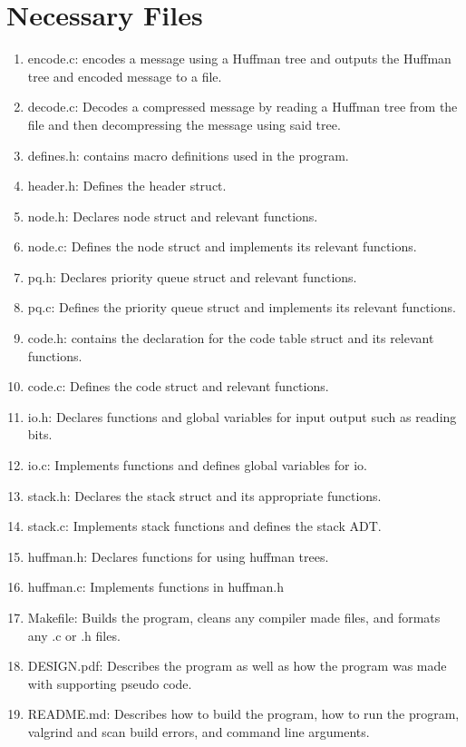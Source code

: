 \documentclass[11pt]{article}
\begin{document}
\section{Necessary Files}
\begin{enumerate}
    \item encode.c: encodes a message using a Huffman tree and outputs the Huffman tree and encoded message to a file.
    \item decode.c: Decodes a compressed message by reading a Huffman tree from the file and then decompressing the message using said tree.
    \item defines.h: contains macro definitions used in the program.
    \item header.h: Defines the header struct.
    \item node.h: Declares node struct and relevant functions.
    \item node.c: Defines the node struct and implements its relevant functions.
    \item pq.h: Declares priority queue struct and relevant functions.
    \item pq.c: Defines the priority queue struct and implements its relevant functions.
    \item code.h: contains the declaration for the code table struct and its relevant functions.
    \item code.c: Defines the code struct and relevant functions.
    \item io.h: Declares functions and global variables for input output such as reading bits.
    \item io.c: Implements functions and defines global variables for io.
    \item stack.h: Declares the stack struct and its appropriate functions.
    \item stack.c: Implements stack functions and defines the stack ADT.
    \item huffman.h: Declares functions for using huffman trees.
    \item huffman.c: Implements functions in huffman.h
    \item Makefile: Builds the program, cleans any compiler made files, and formats any .c or .h files.
    \item DESIGN.pdf: Describes the program as well as how the program was made with supporting pseudo code.
    \item README.md: Describes how to build the program, how to run the program, valgrind and scan build errors, and command line arguments.
\end{enumerate}
\end{document}
